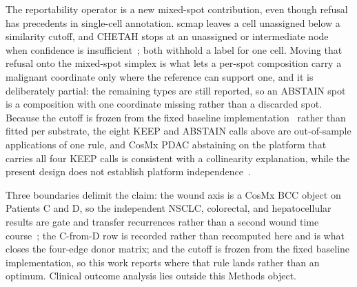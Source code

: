 The reportability operator is a new mixed-spot contribution, even though refusal has precedents in single-cell annotation. scmap leaves a cell unassigned below a similarity cutoff, and CHETAH stops at an unassigned or intermediate node when confidence is insufficient~\citep{Kiselev2018,deKanter2019}; both withhold a label for one cell. Moving that refusal onto the mixed-spot simplex is what lets a per-spot composition carry a malignant coordinate only where the reference can support one, and it is deliberately partial: the remaining types are still reported, so an ABSTAIN spot is a composition with one coordinate missing rather than a discarded spot. Because the cutoff is frozen from the fixed baseline implementation~\citep{Fu2026spgd} rather than fitted per substrate, the eight KEEP and ABSTAIN calls above are out-of-sample applications of one rule, and CosMx PDAC abstaining on the platform that carries all four KEEP calls is consistent with a collinearity explanation, while the present design does not establish platform independence~\citep{Pei2025,He2022,Crowell2025preprint,Sun2025spatial}.

Three boundaries delimit the claim: the wound axis is a CosMx BCC object on Patients C and D, so the independent NSCLC, colorectal, and hepatocellular results are gate and transfer recurrences rather than a second wound time course~\citep{Yerly2022,Yerly2025preprint,Dvorak1986,He2022,Crowell2025preprint,Sun2025spatial}; the C-from-D row is recorded rather than recomputed here and is what closes the four-edge donor matrix; and the cutoff is frozen from the fixed baseline implementation, so this work reports where that rule lands rather than an optimum. Clinical outcome analysis lies outside this Methods object.

